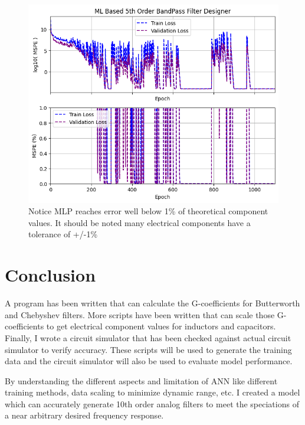 \documentclass[10pt,conference]{IEEEtran}
\begin{document}
\begin{figure}
	\centering
	\includegraphics[width=0.9\linewidth]{Figures/MLP_Loss_Curves_1.png}
	\caption{Notice MLP reaches error well below 1\% of theoretical component values. It should be noted many electrical components have a tolerance of +/-1\%}
	\label{MLP_Loss_Curves_1}
\end{figure}




\section{Conclusion}
A program has been written that can calculate the G-coefficients for Butterworth and Chebyshev filters. More scripts have been written that can scale those G-coefficients to get electrical component values for inductors and capacitors. Finally, I wrote a circuit simulator that has been checked against actual circuit simulator to verify accuracy. These scripts will be used to generate the training data and the circuit simulator will also be used to evaluate model performance.

By understanding the different aspects and limitation of ANN like different training methods, data scaling to minimize dynamic range, etc. I created a model which can accurately generate 10th order analog filters to meet the speciations of a near arbitrary desired frequency response.










\end{document}
